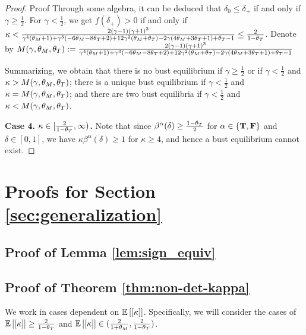 \begin{proof}{Proof}
Through some algebra, it can be deduced that $\delta_0 \leq \delta_+$ if and only if $\gamma \geq \frac{1}{2}$. For $\gamma < \frac{1}{2}$, we get $f(\delta_+) > 0$ if and only if $\kappa < \frac{2 (\gamma-1) (\gamma+1)^3}{\gamma^4 (\tm+1)+\gamma^3 (-6 \tm-8 \tt+2)+12 \gamma^2 (\tm+\tt)-2 \gamma (4 \tm+3 \tt+1)+\tt-1} \leq \frac{2}{1-\tt} $. Denote by $M(\gamma, \tm, \tt) :=  \frac{2 (\gamma-1) (\gamma+1)^3}{\gamma^4 (\tm+1)+\gamma^3 (-6 \tm-8 \tt+2)+12 \gamma^2 (\tm+\tt)-2 \gamma (4 \tm+3 \tt+1)+\tt-1}$

Summarizing, we obtain that there is no bust equilibrium if $\gamma \geq \frac{1}{2}$ or if $\gamma < \frac{1}{2}$ and $\kappa > M(\gamma, \tm, \tt)$; there is a unique bust equilibrium if $\gamma < \frac{1}{2}$ and $\kappa = M(\gamma, \tm, \tt)$; and there are two bust equilibria if $\gamma < \frac{1}{2}$ and $\kappa < M(\gamma, \tm, \tt)$.


\textbf{Case 4. $\kappa \in [\frac{2}{1-\tt}, \infty)$.} Note that since $\beta^\alpha(\delta) \geq \frac{1-\tt}{2}$ for $\alpha \in \{\true, \false\}$ and $\delta \in [0,1]$, we have $\kappa \beta^\alpha(\delta) \geq 1$ for $\kappa \geq 4$, and hence a bust equilibrium cannot exist.
    
\end{proof}

\section{Proofs for Section \ref{sec:generalization}}


\subsection{Proof of Lemma \ref{lem:sign_equiv}}

\TODO 



\subsection{Proof of Theorem \ref{thm:non-det-kappa}}
We work in cases dependent on $\ex{[\kappa]}$. Specifically, we will consider the cases of $\ex{[\kappa]} \geq \frac{2}{1-\tt}$ and $\ex{[\kappa]} \in (\frac{2}{1+\tm}, \frac{2}{1-\tt})$.

